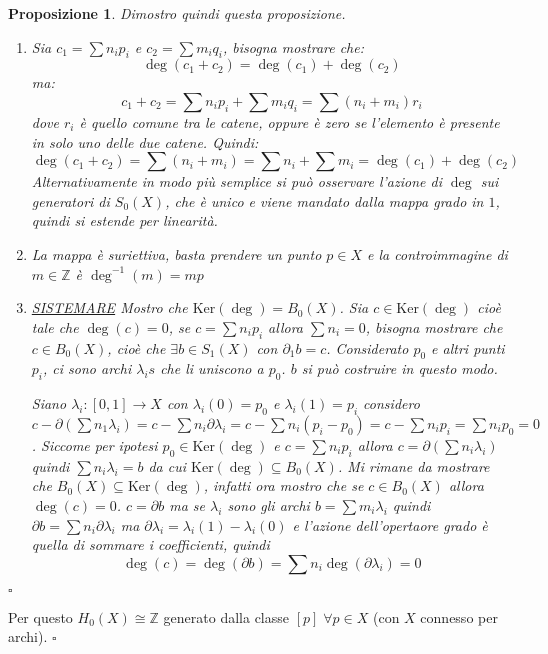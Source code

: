 \documentclass[10pt, twoside=false, x11names]{scrbook}
\newtheorem{proposition}[theorem]{Proposizione}
\newenvironment{proof}{{\textbf{Dimostrazione}:}}{\hfill $\square$}
\newcommand{\Z}{\mathbb{Z}}
\renewcommand{\ker}[1]{\mathrm{Ker}( #1)}
\begin{document}
\begin{proof}
\begin{proposition}
    Dimostro quindi questa proposizione.

    \begin{proof}
      \begin{enumerate}
      \item
        Sia $ c_1 = \sum n_i p_i $ e $ c_2 = \sum m_i q_i $, bisogna mostrare che:
        \[
          \deg(c_1 + c_2) = \deg(c_1) + \deg(c_2)
        \]
        ma:
        \[
          c_1 + c_2 = \sum n_i p_i + \sum m_i q_i = \sum (n_i + m_i)r_i
        \]
        dove $ r_i $ è quello comune tra le catene, oppure è zero se
        l'elemento è presente in solo uno delle due catene.
        Quindi:
        \[
          \deg(c_1 + c_2) = \sum (n_i + m_i) = \sum n_i + \sum m_i = \deg(c_1) + \deg(c_2)
        \]
        Alternativamente in modo più semplice si può osservare l'azione di $ \deg $ sui generatori di $ S_0(X) $,
        che è unico e viene mandato dalla mappa grado in $ 1 $, quindi si estende per linearità.
      \item
        La mappa è suriettiva, basta prendere un punto $ p \in X $ e la controimmagine di $ m \in \Z $ è $ \deg^{-1}(m) = mp $
      \item
        \underline{SISTEMARE}
        Mostro che $ \ker{\deg} = B_0(X) $. Sia $ c \in \ker{\deg} $ cioè tale che $ \deg(c) = 0 $, se
        $ c = \sum n_i p_i $ allora $ \sum n_i = 0 $, bisogna mostrare che $ c \in B_0(X) $, cioè che $ \exists b \in S_1(X) $ con $ \partial_1 b = c $.
        Considerato $ p_0 $ e altri punti $ p_i $, ci sono archi
        $ \lambda_i s $ che li uniscono a $ p_0 $. $ b $ si può costruire in questo modo.

        Siano
        $ \lambda_i : [0,1] \to X $ con $ \lambda_i(0) = p_0 $ e $ \lambda_i(1) = p_i $ considero $ c - \partial\left(\sum n_1 \lambda_i \right) =
        c - \sum n_i \partial \lambda_i = c - \sum n_i (p_i - p_0) = c - \sum n_i p_i = \sum n_i p_0 = 0 $. Siccome per ipotesi $ p_0 \in \ker{\deg} $
        e $ c = \sum n_i p_i $ allora $ c = \partial(\sum n_i \lambda_i) $ quindi $ \sum n_i \lambda_i = b $ da cui $ \ker{\deg} \subseteq B_0(X) $.
        Mi rimane da mostrare che $ B_0(X) \subseteq \ker{\deg} $, infatti ora mostro che se $ c \in B_0(X) $ allora
        $ \deg(c) = 0 $. $ c = \partial b $ ma se $ \lambda_i $ sono gli archi $ b = \sum m_i \lambda_i $ quindi  $ \partial b = \sum n_i \partial \lambda_i $
        ma $ \partial \lambda_i = \lambda_i(1) - \lambda_i(0) $ e l'azione dell'opertaore grado è quella di sommare i coefficienti, quindi
        \[
          \deg(c) = \deg(\partial b) = \sum n_i \deg(\partial \lambda_i) = 0
        \]
      \end{enumerate}
    \end{proof}
  \end{proposition}
  Per questo $ H_0 (X) \cong \Z $ generato dalla classe $ [p] \; \forall p \in X $ (con $ X $ connesso per archi).
\end{proof}
\end{document}
